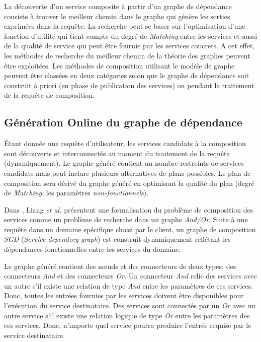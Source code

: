   La découverte d'un service composite à partir d'un graphe de
  dépendance consiste à trouver le meilleur chemin dans le graphe qui
  génère les sorties exprimées dans la requête. La recherche peut se
  baser sur l'optimisation d'une fonction d'utilité qui tient compte
  du degré de \textit{Matching} entre les services et aussi de la
  qualité de service qui peut être fournie par les services
  concrets. A cet effet, les méthodes de recherche du meilleur chemin
  de la théorie des graphes peuvent être exploitées.  Les méthodes de
  composition utilisant le modèle de graphe peuvent être classées en
  deux catégories selon que le graphe de dépendance soit construit à
  priori (en phase de publication des services) ou pendant le
  traitement de la requête de composition.

  \subsection{Génération Online du graphe de dépendance}
  \label{sec:generation-online}
  Étant donnée une requête d'utilisateur, les services candidats à
  la composition sont découverts et interconnectés au moment du
  traitement de la requête (dynamiquement). Le graphe généré
  contient un nombre restreints de services candidats mais peut
  inclure plusieurs alternatives de plans possibles. Le plan de
  composition sera dérivé du graphe généré en optimisant la qualité du
  plan (degré de \textit{Matching}, les paramètres
  \textit{non-fonctionnels}).\bigskip

  Dans \cite{liang2005and}, Liang \textit{et al.} présentent une
  formalisation du problème de composition des services comme un
  problème de recherche dans un graphe \textit{And/Or}. Suite à une
  requête dans un domaine spécifique choisi par le client, un graphe
  de composition \textit{SGD} (\textit{Service dependecy graph}) est
  construit dynamiquement reflétant les dépendances fonctionnelles
  entre les services du domaine.\medskip

  Le graphe généré contient des nœuds et des connecteurs de deux
  types: des connecteurs \textit{And} et des connecteurs
  \textit{Or}. Un connecteur \textit{And} relie des services avec un
  autre s'il existe une relation de type \textit{And} entre
  les paramètres de ces services. Donc, toutes les entrées fournies par
  les services doivent être disponibles pour l'exécution du service
  destinataire. Des services sont connectés par un \textit{Or} avec un
  autre service s'il existe une relation logique de type \textit{Or}
  entre les paramètres des ces services. Donc, n'importe quel service
  pourra produire l'entrée requise par le service
  destinataire.\medskip

